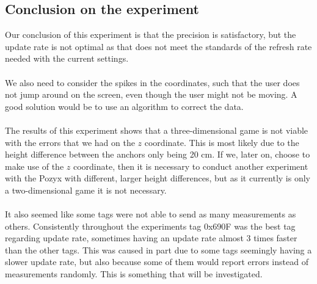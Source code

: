 \subsection{Conclusion on the experiment}
Our conclusion of this experiment is that the precision is satisfactory, but the update rate is not optimal as that does not meet the standards of the refresh rate needed with the current settings.
\\\\
We also need to consider the spikes in the coordinates, such that the user does not jump around on the screen, even though the user might not be moving.
A good solution would be to use an algorithm to correct the data.
\\\\
The results of this experiment shows that a three-dimensional game is not viable with the errors that we had on the $z$ coordinate.
This is most likely due to the height difference between the anchors only being 20 cm.
If we, later on, choose to make use of the $z$ coordinate, then it is necessary to conduct another experiment with the Pozyx with different, larger height differences, but as it currently is only a two-dimensional game it is not necessary.
\\\\
It also seemed like some tags were not able to send as many measurements as others.
Consistently throughout the experiments tag 0x690F was the best tag regarding update rate, sometimes having an update rate almost 3 times faster than the other tags.
This was caused in part due to some tags seemingly having a slower update rate, but also because some of them would report errors instead of measurements randomly.
This is something that will be investigated.
